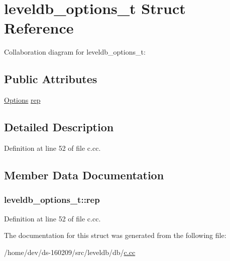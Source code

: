 \hypertarget{structleveldb__options__t}{}\section{leveldb\+\_\+options\+\_\+t Struct Reference}
\label{structleveldb__options__t}


Collaboration diagram for leveldb\+\_\+options\+\_\+t\+:
\subsection*{Public Attributes}
\begin{DoxyCompactItemize}
\item 
\hyperlink{structleveldb_1_1_options}{Options} \hyperlink{structleveldb__options__t_a4f9a6dde987957ab489bf26c9d191df9}{rep}
\end{DoxyCompactItemize}


\subsection{Detailed Description}


Definition at line 52 of file c.\+cc.



\subsection{Member Data Documentation}
\hypertarget{structleveldb__options__t_a4f9a6dde987957ab489bf26c9d191df9}{}
\subsubsection[{rep}]{ leveldb\+\_\+options\+\_\+t\+::rep}\label{structleveldb__options__t_a4f9a6dde987957ab489bf26c9d191df9}


Definition at line 52 of file c.\+cc.



The documentation for this struct was generated from the following file\+:\begin{DoxyCompactItemize}
\item 
/home/dev/ds-\/160209/src/leveldb/db/\hyperlink{c_8cc}{c.\+cc}\end{DoxyCompactItemize}
